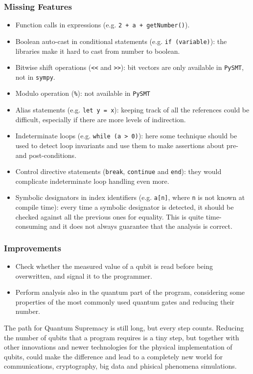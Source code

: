 \documentclass[12pt,a4paper]{report}
\theoremstyle{definition}
\theoremstyle{definition}
\theoremstyle{definition}
\begin{document}
\subsubsection{Missing Features}
\begin{itemize}
    \itemsep 0em
    \item Function calls in expressions (e.g. \texttt{2 + a + getNumber()}).
    \item Boolean auto-cast in conditional statements (e.g. \texttt{if (variable)}): the libraries make it hard to cast from number to boolean.
    \item Bitwise shift operations (\texttt{<<} and \texttt{>>}): bit vectors are only available in \texttt{PySMT}, not in \texttt{sympy}.
    \item Modulo operation (\texttt{\%}): not available in \texttt{PySMT}
    \item Alias statements (e.g. \texttt{let y = x}): keeping track of all the references could be difficult, especially if there are more levels of indirection.
    \item Indeterminate loops (e.g. \texttt{while (a > 0)}): here some technique should be used to detect loop invariants and use them to make assertions about pre- and post-conditions.
    \item Control directive statements (\texttt{break}, \texttt{continue} and \texttt{end}): they would complicate indeterminate loop handling even more.
    \item Symbolic designators in index identifiers (e.g. \texttt{a[n]}, where \texttt{n} is not known at compile time): every time a symbolic designator is detected, it should be checked against all the previous ones for equality. This is quite time-consuming and it does not always guarantee that the analysis is correct.
\end{itemize}

\subsubsection{Improvements}
\begin{itemize}
    \itemsep 0em
    \item Check whether the measured value of a qubit is read before being overwritten, and signal it to the programmer.
    \item Perform analysis also in the quantum part of the program, considering some properties of the most commonly used quantum gates and reducing their number.
\end{itemize}

The path for Quantum Supremacy is still long, but every step counts. Reducing the number of qubits that a program requires is a tiny step, but together with other innovations and newer technologies for the physical implementation of qubits, could make the difference and lead to a completely new world for communications, cryptography, big data and phisical phenomena simulations.

\printbibliography
\end{document}
